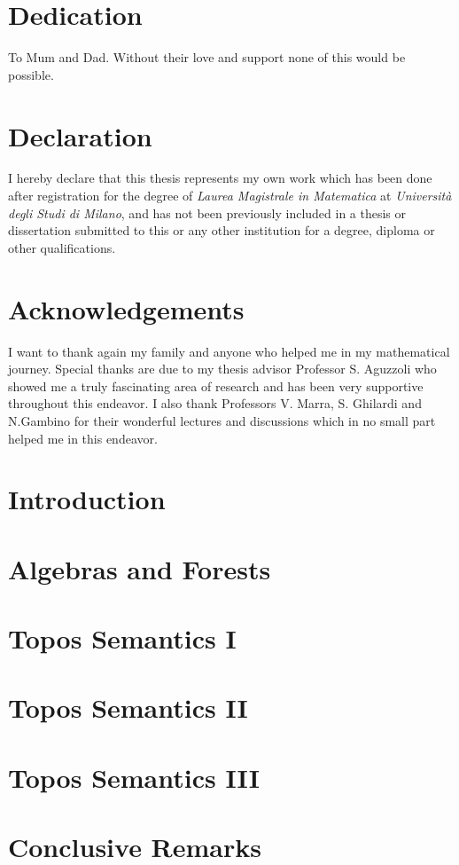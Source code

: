 \documentclass[12pt]{report}
\theoremstyle{plain}
\theoremstyle{definition}
\theoremstyle{remark}
\begin{document}
 	\chapter*{Dedication}
 	To Mum and Dad. \newline
 	Without their love and support none of this would be possible.
 	\newpage
 		${}$ \newpage
 	
 	\chapter*{Declaration}
 	I hereby declare that this thesis represents my own work which has
 	been done after registration for the degree of \emph{Laurea Magistrale in Matematica} at \emph{Università degli Studi di Milano}, and has not been
 	previously included in a thesis or dissertation submitted to this or any
 	other institution for a degree, diploma or other qualifications.
 	\newpage
 		${}$ \newpage
 		
 	\chapter*{Acknowledgements}
 	I want to thank again my family and anyone who helped me in my mathematical journey. \newline
 	Special thanks are due to my thesis advisor Professor S. Aguzzoli who showed me a truly fascinating area of research and has been very supportive throughout this endeavor. \newline
 	I also thank Professors V. Marra, S. Ghilardi and N.Gambino for their wonderful lectures and discussions which in no small part helped me in this endeavor.  
 		\newpage
 	${}$ \newpage
 	\tableofcontents
 	
 \chapter{Introduction}
 
 
 \chapter{Algebras and Forests}
 
 
 \chapter{Topos Semantics I}
 
 
 \chapter{Topos Semantics II}
 
 
 \chapter{Topos Semantics III}
 
 
 \chapter{Conclusive Remarks}
 
 
% 
 	
 
\end{document}
